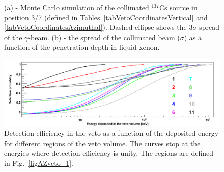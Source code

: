 \begin{figure}[!t]
\centering
{}
\caption[Monte Carlo simulation of the collimated $^{137}$Cs source, and the spread of the collimated beam as a function of the penetration depth in liquid xenon]{(a) - Monte Carlo simulation of the collimated $^{137}$Cs source in position 3/7 (defined in Tables~\ref{tabVetoCoordinatesVertical} and \ref{tabVetoCoordinatesAzimuthal}). Dashed ellipse shows the 3$\sigma$ spread of the $\gamma$-beam. (b) - the spread of the collimated beam ($\sigma$) as a function of the penetration depth in liquid xenon.}
\label{figCollimatorMC}
\end{figure}

\begin{figure}[!b]
\begin{center}
\includegraphics[width=1.0\linewidth]{plots/VetoMeasurement/VetoRegions.png}
\caption[Detection efficiency in the veto as a function of the deposited energy for different parts of the veto volume]{Detection efficiency in the veto as a function of the deposited energy for different regions of the veto volume. The curves stop at the energies where detection efficiency is unity.  The regions are defined in Fig.~\ref{figAZveto_1}.}
\label{figPolynomials}
\end{center}
\end{figure}

